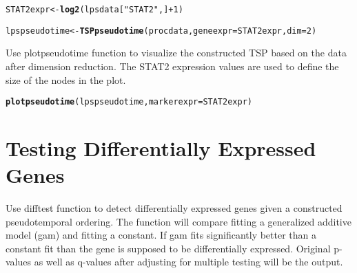 \documentclass[10pt,oneside]{article}\usepackage[]{graphicx}\usepackage[]{color}
\makeatletter
\newcommand{\hlnum}[1]{\textcolor[rgb]{0.686,0.059,0.569}{#1}}%
\newcommand{\hlstr}[1]{\textcolor[rgb]{0.192,0.494,0.8}{#1}}%
\newcommand{\hlopt}[1]{\textcolor[rgb]{0,0,0}{#1}}%
\newcommand{\hlstd}[1]{\textcolor[rgb]{0.345,0.345,0.345}{#1}}%
\newcommand{\hlkwb}[1]{\textcolor[rgb]{0.69,0.353,0.396}{#1}}%
\newcommand{\hlkwc}[1]{\textcolor[rgb]{0.333,0.667,0.333}{#1}}%
\newcommand{\hlkwd}[1]{\textcolor[rgb]{0.737,0.353,0.396}{\textbf{#1}}}%
\newenvironment{kframe}{%
 \def\at@end@of@kframe{}%
 \ifinner\ifhmode%
  \def\at@end@of@kframe{\end{minipage}}%
  \begin{minipage}{\columnwidth}%
 \fi\fi%
 \def\FrameCommand##1{\hskip\@totalleftmargin \hskip-\fboxsep
 \colorbox{shadecolor}{##1}\hskip-\fboxsep
     \hskip-\linewidth \hskip-\@totalleftmargin \hskip\columnwidth}%
 \MakeFramed {\advance\hsize-\width
   \@totalleftmargin\z@ \linewidth\hsize
   \@setminipage}}%
 {\par\unskip\endMakeFramed%
 \at@end@of@kframe}
\newenvironment{knitrout}{}{} %
\makeatother
\begin{document}
\begin{knitrout}
\color{fgcolor}\begin{kframe}
\begin{alltt}
\hlstd{STAT2expr} \hlkwb{<-} \hlkwd{log2}\hlstd{(lpsdata[}\hlstr{"STAT2"}\hlstd{,]}\hlopt{+}\hlnum{1}\hlstd{)}
\end{alltt}


{\ttfamily\noindent\bfseries\color{errorcolor}{\#\# Error: object 'lpsdata' not found}}\begin{alltt}
\hlstd{lpspseudotime} \hlkwb{<-} \hlkwd{TSPpseudotime}\hlstd{(procdata,} \hlkwc{geneexpr} \hlstd{= STAT2expr,} \hlkwc{dim} \hlstd{=} \hlnum{2}\hlstd{)}
\end{alltt}


{\ttfamily\noindent\bfseries{}}\end{kframe}
\end{knitrout}

Use plotpseudotime function to visualize the constructed TSP based on the data after dimension reduction. The STAT2 expression values are used to define the size of the nodes in the plot.

\begin{knitrout}
\color{fgcolor}\begin{kframe}
\begin{alltt}
\hlkwd{plotpseudotime}\hlstd{(lpspseudotime,} \hlkwc{markerexpr} \hlstd{= STAT2expr)}
\end{alltt}


{\ttfamily\noindent\bfseries{}}\end{kframe}
\end{knitrout}

\section{Testing Differentially Expressed Genes}

Use difftest function to detect differentially expressed genes given a constructed pseudotemporal ordering. The function will compare fitting a generalized additive model (gam) and fitting a constant. If gam fits significantly better than a constant fit than the gene is supposed to be differentially expressed. Original p-values as well as q-values after adjusting for multiple testing will be the output.
\end{document}
